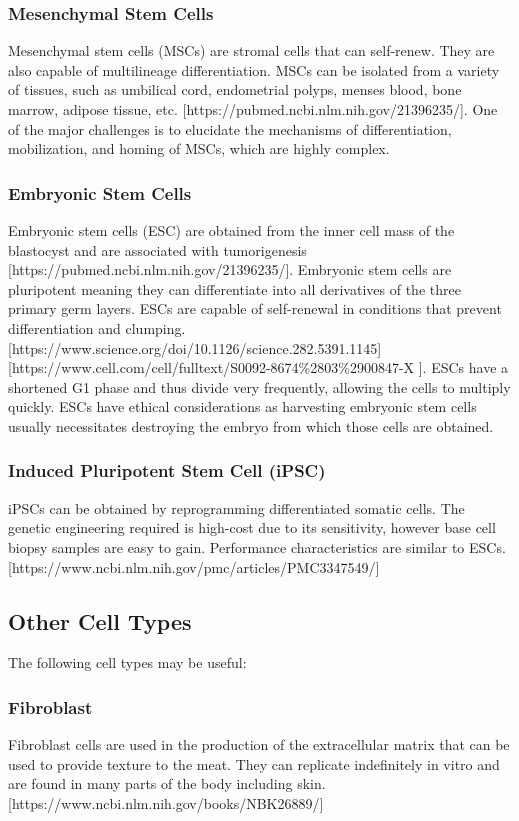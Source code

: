 \subsubsection*{Mesenchymal Stem Cells}
Mesenchymal stem cells (MSCs) are stromal cells that can self-renew. They are also capable of multilineage differentiation. MSCs can be isolated from a variety of tissues, such as umbilical cord, endometrial polyps, menses blood, bone marrow, adipose tissue, etc. [https://pubmed.ncbi.nlm.nih.gov/21396235/]. One of the major challenges is to elucidate the mechanisms of differentiation, mobilization, and homing of MSCs, which are highly complex.

\subsubsection*{Embryonic Stem Cells}
Embryonic stem cells (ESC) are obtained from the inner cell mass of the blastocyst and are associated with tumorigenesis [https://pubmed.ncbi.nlm.nih.gov/21396235/]. Embryonic stem cells are pluripotent meaning they can differentiate into all derivatives of the three primary germ layers. ESCs are capable of self-renewal in conditions that prevent differentiation and clumping. [https://www.science.org/doi/10.1126/science.282.5391.1145] [https://www.cell.com/cell/fulltext/S0092-8674\%2803\%2900847-X ]. ESCs have a shortened G1 phase and thus divide very frequently, allowing the cells to multiply quickly. ESCs have ethical considerations as harvesting embryonic stem cells usually necessitates destroying the embryo from which those cells are obtained.

\subsubsection*{Induced Pluripotent Stem Cell (iPSC)}
iPSCs can be obtained by reprogramming differentiated somatic cells. The genetic engineering required is high-cost due to its sensitivity, however base cell biopsy samples are easy to gain. Performance characteristics are similar to ESCs. [https://www.ncbi.nlm.nih.gov/pmc/articles/PMC3347549/] 

\subsection*{Other Cell Types}
The following cell types may be useful:

\subsubsection*{Fibroblast}
Fibroblast cells are used in the production of the extracellular matrix that can be used to provide texture to the meat. They can replicate indefinitely in vitro and are found in many parts of the body including skin. [https://www.ncbi.nlm.nih.gov/books/NBK26889/]

